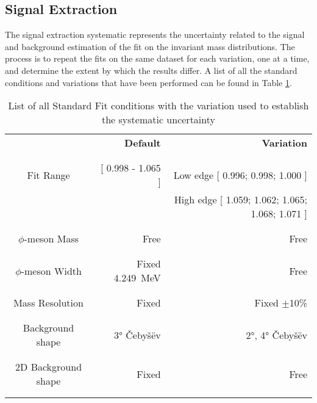 \subsection{Signal Extraction}
The signal extraction systematic represents the uncertainty related to the signal and background estimation of the fit on the invariant mass distributions. The process is to repeat the fits on the same dataset for each variation, one at a time, and determine the extent by which the results differ. A list of all the standard conditions and variations that have been performed can be found in Table \ref{tab:Syst_SE}.
\begin{table}[h]
\center
\begin{tabular}{c|r|r}
					&\textbf{Default}							&\textbf{Variation}		\\
					\\ \hline \\
Fit Range				&[ 0.998 - 1.065 ]							& Low edge  [ 0.996; 0.998; 1.000 ]\\
					&										& High edge [ 1.059; 1.062; 1.065; 1.068; 1.071  ]\\
					\\ \hline \\
$\phi$-meson Mass		&Free									&Free\\
					\\ \hline \\
$\phi$-meson Width		&Fixed \SI{4.249}{\mega\electronvolt}\cite{PDG}	&Free\\
					\\ \hline \\
Mass Resolution		&Fixed									&Fixed $\pm$10\%\\
					\\ \hline \\
Background shape		&3° \v{C}eby\v{s}\"{e}v 						&2°, 4° \v{C}eby\v{s}\"{e}v \\
					\\ \hline \\
2D Background shape	&Fixed									&Free\\
					\\ \hline \\

\end{tabular}
\caption{List of all Standard Fit conditions with the variation used to establish the systematic uncertainty}
\label{tab:Syst_SE}
\end{table}

